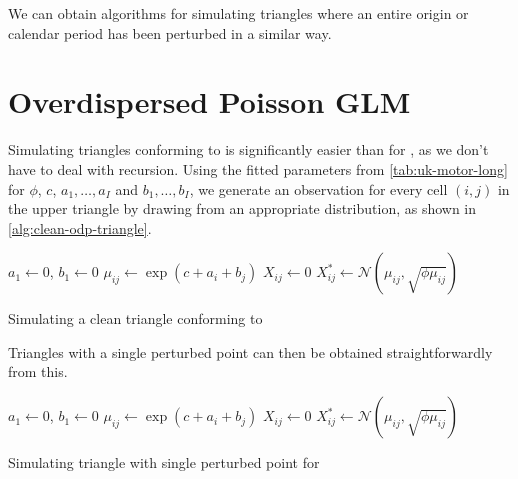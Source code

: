 \documentclass[a4paper]{book}
\begin{document}
We can obtain algorithms for simulating triangles where an entire origin or calendar period has been perturbed in a similar way.

\section{Overdispersed Poisson GLM} \label{sec:odp-sim}

Simulating triangles conforming to  is significantly easier than for , as we don't have to deal with recursion. Using the fitted parameters from \cref{tab:uk-motor-long} for $\phi$, $c$, $a_1, \dots, a_I$ and $b_1, \dots, b_I$, we generate an observation for every cell $(i, j)$ in the upper triangle by drawing from an appropriate distribution, as shown in \cref{alg:clean-odp-triangle}.

\begin{algorithm}[H]
  \begin{algorithmic}
    \State $a_1 \gets 0$, $b_1 \gets 0$
      \State $\mu_{ij} \gets \exp(c + a_i + b_j)$
      \State $X_{ij} \gets 0$
    \EndFor
        \State $X^*_{ij} \gets \mathcal{N}(\mu_{ij}, \sqrt{\phi \mu_{ij}})$
      \EndFor
    \EndFor
    \State {}
  \end{algorithmic}
  \caption{Simulating a clean triangle conforming to }
  \label{alg:clean-odp-triangle}
\end{algorithm}

Triangles with a single perturbed point can then be obtained straightforwardly from this.

\begin{algorithm}[H]
  \begin{algorithmic}
    \State $a_1 \gets 0$, $b_1 \gets 0$
      \State $\mu_{ij} \gets \exp(c + a_i + b_j)$
      \State $X_{ij} \gets 0$
    \EndFor
        \State $X^*_{ij} \gets \mathcal{N}(\mu_{ij}, \sqrt{\phi \mu_{ij}})$
      \EndFor
    \EndFor
    \State {}
  \end{algorithmic}
  \caption{Simulating triangle with single perturbed point for }
  \label{alg:pert-odp-triangle}
\end{algorithm}
\end{document}

